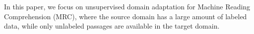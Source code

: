 In this paper, we focus on unsupervised domain adaptation for Machine Reading Comprehension (MRC), where the source domain has a large amount of labeled data, while only unlabeled passages are available in the target domain.
